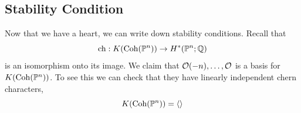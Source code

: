 \documentclass[12pt]{article}
\DeclareMathOperator{\chern}{ch}
\begin{document}
\subsection{Stability Condition}
Now that we have a heart, we can write down stability conditions. Recall that
\[\chern: K(\Coh(\P^n)) \to H^*(\P^n;\Q)\]
is an isomorphism onto its image. We claim that $\mathcal{O}(-n),\dots,\mathcal{O}$ is a basis for $K(\operatorname{Coh}(\mathbb{P}^n))$. To see this we can check that they have linearly independent chern characters,
\[K(\operatorname{Coh}(\mathbb{P}^n)) = \left\langle\right\rangle\]
\end{document}
